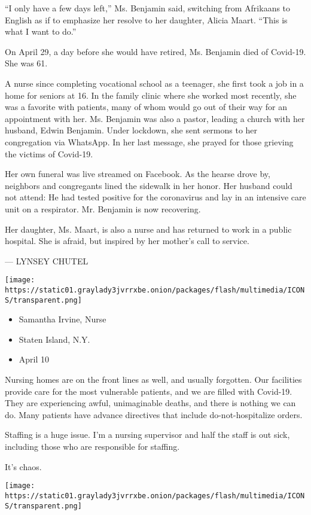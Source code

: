 ``I only have a few days left,'' Ms. Benjamin said, switching from
Afrikaans to English as if to emphasize her resolve to her daughter,
Alicia Maart. ``This is what I want to do.''

On April 29, a day before she would have retired, Ms. Benjamin died of
Covid-19. She was 61.

A nurse since completing vocational school as a teenager, she first took
a job in a home for seniors at 16. In the family clinic where she worked
most recently, she was a favorite with patients, many of whom would go
out of their way for an appointment with her. Ms. Benjamin was also a
pastor, leading a church with her husband, Edwin Benjamin. Under
lockdown, she sent sermons to her congregation via WhatsApp. In her last
message, she prayed for those grieving the victims of Covid-19.

Her own funeral was live streamed on Facebook. As the hearse drove by,
neighbors and congregants lined the sidewalk in her honor. Her husband
could not attend: He had tested positive for the coronavirus and lay in
an intensive care unit on a respirator. Mr. Benjamin is now recovering.

Her daughter, Ms. Maart, is also a nurse and has returned to work in a
public hospital. She is afraid, but inspired by her mother's call to
service.

--- LYNSEY CHUTEL

\texttt{[image: https://static01.graylady3jvrrxbe.onion/packages/flash/multimedia/ICONS/transparent.png]}

\begin{itemize}
\tightlist
\item
  Samantha Irvine, Nurse
\item
  Staten Island, N.Y.
\item
  April 10
\end{itemize}

Nursing homes are on the front lines as well, and usually forgotten. Our
facilities provide care for the most vulnerable patients, and we are
filled with Covid-19. They are experiencing awful, unimaginable deaths,
and there is nothing we can do. Many patients have advance directives
that include do-not-hospitalize orders.

Staffing is a huge issue. I'm a nursing supervisor and half the staff is
out sick, including those who are responsible for staffing.

It's chaos.

\texttt{[image: https://static01.graylady3jvrrxbe.onion/packages/flash/multimedia/ICONS/transparent.png]}

